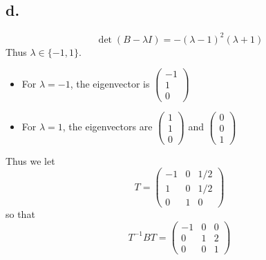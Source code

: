\documentclass[11pt]{article}
\theoremstyle{mystyle}
\theoremstyle{definition}
\begin{document}
\subsection*{d.}
\[
  \det(B - \lambda I) = -(\lambda-1)^2 (\lambda+1)
\]
Thus $\lambda \in \{-1,1\}$. 
\begin{itemize}
  \item For $\lambda = -1$, the eigenvector is 
    $\begin{pmatrix}
    -1 \\ 1 \\ 0 
    \end{pmatrix}$
  \item For $\lambda = 1$, the eigenvectors are
    $\begin{pmatrix}
    1 \\ 1 \\ 0 
    \end{pmatrix}$
    and 
    $\begin{pmatrix}
    0 \\ 0 \\ 1 
    \end{pmatrix}$
\end{itemize}
Thus we let 
\[
  T = 
  \begin{pmatrix}
    -1 & 0 & 1/2 \\
    1 & 0 & 1/2 \\
    0 & 1 & 0
  \end{pmatrix}
\]
so that 
\[
  T^{-1} B T = 
  \begin{pmatrix}
    -1 & 0 & 0 \\
    0 & 1 & 2 \\
    0 & 0 & 1
  \end{pmatrix}
\]
\end{document}
